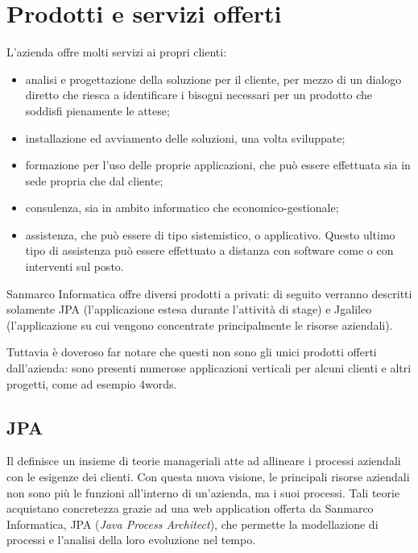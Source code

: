 \section{Prodotti e servizi offerti}

L'azienda offre molti servizi ai propri clienti:

\begin{itemize}
	\item analisi e progettazione della soluzione per il cliente, per mezzo di un
	dialogo diretto che riesca a identificare i bisogni necessari per un prodotto
	che soddisfi pienamente le attese;
	\item installazione ed avviamento delle soluzioni, una volta sviluppate;
	\item formazione per l'uso delle proprie applicazioni, che può essere
	effettuata sia in sede propria che dal cliente;
	\item consulenza, sia in ambito informatico che economico-gestionale;
	\item assistenza, che può essere di tipo sistemistico,  o
	applicativo. Questo ultimo tipo di assistenza può essere effettuato a distanza
	con software come  o con interventi sul posto.
\end{itemize}

Sanmarco Informatica offre diversi prodotti a privati: di seguito verranno
descritti solamente JPA (l'applicazione estesa durante l'attività di stage) e
Jgalileo (l'applicazione su cui vengono concentrate principalmente le risorse
aziendali).

Tuttavia è doveroso far notare che questi non sono gli unici prodotti offerti
dall'azienda: sono presenti numerose applicazioni verticali per alcuni clienti
e altri progetti, come ad esempio 4words.

\subsection{JPA}

Il  definisce un insieme di teorie manageriali atte ad allineare i
processi aziendali con le esigenze dei clienti. Con questa nuova visione, le
principali risorse aziendali non sono più le funzioni all'interno di
un'azienda, ma i suoi processi. Tali teorie acquistano concretezza grazie ad
una web application offerta da Sanmarco Informatica, JPA (\emph{Java Process
Architect}), che permette la modellazione di processi e l'analisi della loro
evoluzione nel tempo.

